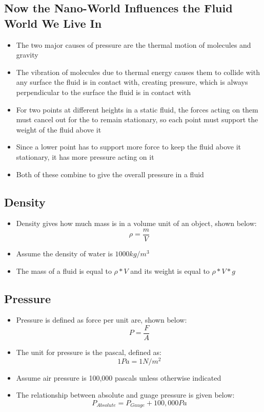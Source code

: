 \subsection{Now the Nano-World Influences the Fluid World We Live In}
\begin{itemize}
    \item The two major causes of pressure are the thermal motion of molecules and gravity
    \item The vibration of molecules due to thermal energy causes them to collide with any surface the fluid is in contact with, creating pressure, which is always perpendicular to the surface the fluid is in contact with
    \item For two points at different heights in a static fluid, the forces acting on them must cancel out for the to remain stationary, so each point must support the weight of the fluid above it
    \item Since a lower point has to support more force to keep the fluid above it stationary, it has more pressure acting on it
    \item Both of these combine to give the overall pressure in a fluid
\end{itemize}

\subsection{Density}
\begin{itemize}
    \item Density gives how much mass is in a volume unit of an object, shown below: \[\rho=\frac{m}{V}\]
    \item Assume the density of water is \(1000kg/m^3\)
    \item The mass of a fluid is equal to \(\rho*V\) and its weight is equal to \(\rho*V*g\)
\end{itemize}

\subsection{Pressure}
\begin{itemize}
    \item Pressure is defined as force per unit are, shown below: \[P=\frac{F}{A}\]
    \item The unit for pressure is the pascal, defined as: \[1Pa = 1 N/m^2\]
    \item Assume air pressure is 100,000 pascals unless otherwise indicated 
    \item The relationship between absolute and guage pressure is given below: \[P_{Absolute}=P_{Gauge}+100,000Pa\]
\end{itemize}

